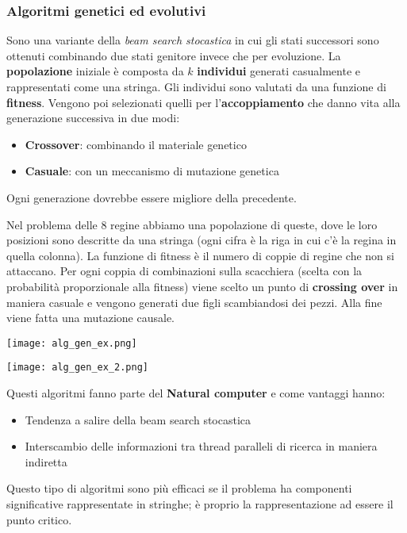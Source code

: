 \subsubsection{Algoritmi genetici ed evolutivi}
Sono una variante della \emph{beam search stocastica} in cui gli stati successori sono ottenuti combinando due stati genitore invece che per evoluzione.
La \textbf{popolazione} iniziale è composta da $k$ \textbf{individui} generati casualmente e rappresentati come una stringa.
Gli individui sono valutati da una funzione di \textbf{fitness}. Vengono poi selezionati quelli per l'\textbf{accoppiamento} che danno vita alla generazione successiva in due modi:
\begin{itemize}
	\item \textbf{Crossover}: combinando il materiale genetico
	\item \textbf{Casuale}: con un meccanismo di mutazione genetica
\end{itemize}
Ogni generazione dovrebbe essere migliore della precedente.
\begin{example}[8 regine]
	Nel problema delle 8 regine abbiamo una popolazione di queste, dove le loro posizioni sono descritte da una stringa (ogni cifra è la riga in cui c'è la regina in quella colonna). La funzione di fitness è il numero di coppie di regine che non si attaccano.
	Per ogni coppia di combinazioni sulla scacchiera (scelta con la probabilità proporzionale alla fitness) viene scelto un punto di \textbf{crossing over} in maniera casuale e vengono generati due figli scambiandosi dei pezzi. Alla fine viene fatta una mutazione causale.
	\begin{center}
		\texttt{[image: alg\_gen\_ex.png]}
	\end{center}
	\begin{center}
		\texttt{[image: alg\_gen\_ex\_2.png]}
	\end{center}
\end{example}
\noindent Questi algoritmi fanno parte del \textbf{Natural computer} e come vantaggi hanno:
\begin{itemize}
	\item Tendenza a salire della beam search stocastica
	\item Interscambio delle informazioni tra thread paralleli di ricerca in maniera indiretta
\end{itemize}
Questo tipo di algoritmi sono più efficaci se il problema ha componenti significative rappresentate in stringhe; è proprio la rappresentazione ad essere il punto critico.

